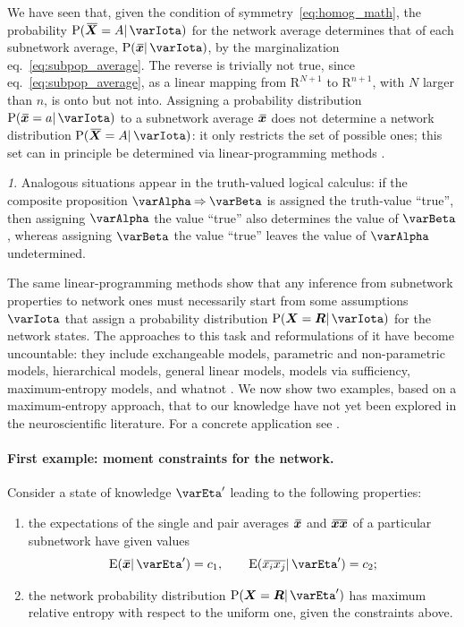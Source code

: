 \documentclass{article}
\theoremstyle{remark}
\theoremstyle{innote}
\newtheorem*{innote}{}
\newcommand*{\citep}{\parencites}
\newcommand*{\RR}{\bm{\mathrm{R}}}
\newcommand*{\limplies}{\mathbin{\Rightarrow}}%
\renewcommand*{\|}{\mathpunct{|}}%
\newcommand*{\p}{\mathrm{P}}%
\newcommand*{\eqn}{eq.}%
\newcommand*{\eg}{{e.g.}}
\newcommand*{\E}{\mathrm{E}}
\DeclarePairedDelimiter\expp{(}{)}
\newcommand*{\expe}{\E\expp}%
\theoremstyle{simple}
\newcommand*{\widebar}[1]{{\mkern1.5mu\skew{2}\overline{\mkern-1.5mu#1\mkern-1.5mu}\mkern 1.5mu}}
\newcommand*{\av}{\widebar} %
\newcommand*{\sav}{\widebar} %
\newcommand*{\yxx}{x}%
\newcommand*{\yx}{\bm{\yxx}}%
\newcommand*{\yxs}{\sav{\yx}}%
\newcommand*{\yX}{\bm{X}}%
\newcommand*{\yXf}{\av{\yX}}%
\newcommand*{\yR}{\bm{R}}%
\newcommand*{\yH}{\varIota}
\newcommand*{\yHa}{\varEta'}
\begin{document}
We have seen that, given the condition of symmetry~\eqref{eq:homog_math},
the probability $\p(\yXf = A \|\yH)$ for the network average determines
that of each subnetwork average, $\p(\yxs \|\yH)$, by the
marginalization \eqn~\eqref{eq:subpop_average}. The reverse is trivially
not true, since \eqn~\eqref{eq:subpop_average}, as a linear mapping from
$\RR^{N+1}$ to $\RR^{n+1}$, with $N$ larger than $n$, is onto but not into.
Assigning a probability distribution $\p(\yxs = a \|\yH)$ to a
subnetwork average $\yxs$ does not determine a network distribution
$\p(\yXf = A\|\yH)$: it only restricts the set of possible ones; this
set can in principle be determined via linear-programming methods
\citep{hailperin1965,hailperin1984,hailperin1996,hailperin2006,hailperin2011}.
\begin{innote}
  Analogous situations appear in the truth-valued logical calculus: if the
  composite proposition $\varAlpha\limplies \varBeta$ is assigned the
  truth-value \enquote{true}, then assigning $\varAlpha$ the value
  \enquote{true} also determines the value of $\varBeta$, whereas assigning
  $\varBeta$ the value \enquote{true} leaves the value of $\varAlpha$
  undetermined.
\end{innote}
The same linear-programming methods show that any inference from subnetwork
properties to network ones must necessarily start from some assumptions
$\varIota$ that assign a probability distribution
$\p(\yX = \yR \| \varIota)$ for the network states. The approaches to
this task and reformulations of it have become uncountable: they include
exchangeable models, parametric and non-parametric models, hierarchical
models, general linear models, models via sufficiency, maximum-entropy
models, and whatnot
\citep[\eg:][]{jeffreys1931_r1973,jeffreys1939_r2003,jaynes1994_r2003,bernardoetal1994,gelmanetal1995_r2014,ghoshetal1997,kallenberg2005,gregory2005,sivia1996_r2006,ferreiraetal2007,dawid2013,damienetal2013}.
We now show two examples, based on a maximum-entropy approach, that to our
knowledge have not yet been explored in the neuroscientific literature. For
a concrete application see \citep{rostamietal2016b}.



\paragraph{First example: moment constraints for the network.}
\label{sec:maxent_moments}
Consider a state of knowledge $\yHa$ leading to the following properties:
\begin{enumerate}%
\item the expectations of the single and pair averages $\yxs$ and
  $\sav{\yx\yx}$ of a particular subnetwork have given values
  \begin{equation}
    \label{eq:constr_ex1}
    \expe{\yxs \| \yHa} = c_1, \qquad \expe{\sav{x_i x_j}\|\yHa} = c_2;
  \end{equation}
\item the network probability distribution $\p(\yX = \yR \|\yHa)$
  has maximum relative entropy with respect to the uniform one, given the
  constraints above.
\end{enumerate}
\end{document}
